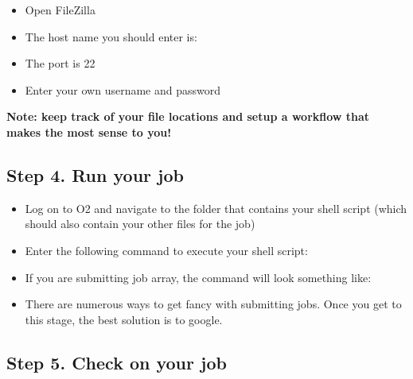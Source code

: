 \documentclass[11pt, oneside]{article}   	%
\begin{document}
\begin{itemize}
	\item Open FileZilla
	\item The host name you should enter is:  \normalfont
	\item The port is 22
	\item Enter your own username and password
\end{itemize}

\noindent \textbf{Note: keep track of your file locations and setup a workflow that makes the most sense to you!} 

\subsection*{Step 4. Run your job} 

\begin{itemize}
	\item Log on to O2 and navigate to the folder that contains your shell script (which should also contain your other files for the job)
	\item Enter the following command to execute your shell script: 
	
	\begin{center}
	\end{center}
	
	\item \normalfont If you are submitting job array, the command will look something like: 
	
	\begin{center}
	\end{center}
	
	\item \normalfont There are numerous ways to get fancy with submitting jobs. Once you get to this stage, the best solution is to google.  
\end{itemize}


\subsection*{Step 5. Check on your job} 
\end{document}
